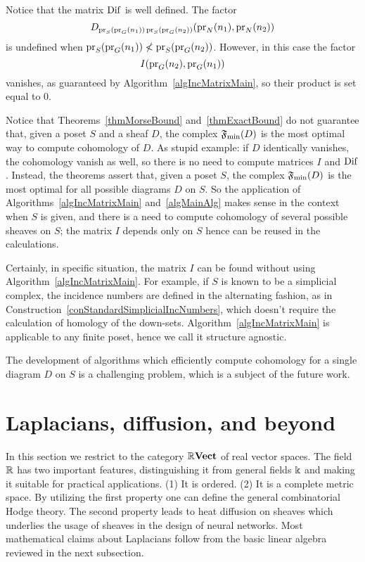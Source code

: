Notice that the matrix $\operatorname{Dif}$ is well defined. The factor
\[
D_{\operatorname{pr}_S(\operatorname{pr}_G(n_1))\operatorname{pr}_S(\operatorname{pr}_G(n_2))}(\operatorname{pr}_N(n_1),\operatorname{pr}_N(n_2))
\]
is undefined when $\operatorname{pr}_S(\operatorname{pr}_G(n_1))\nless\operatorname{pr}_S(\operatorname{pr}_G(n_2))$. However, in this case the factor
\[
I(\operatorname{pr}_G(n_2),\operatorname{pr}_G(n_1))
\]
vanishes, as guaranteed by Algorithm~\ref{algIncMatrixMain}, so their product is set equal to $0$.

\begin{rem}\label{remAgnosticComputations}
Notice that Theorems~\ref{thmMorseBound} and~\ref{thmExactBound} do not guarantee that, given a poset $S$ and a sheaf $D$, the complex $\mathfrak{F}_{\min}(D)$ is the most optimal way to compute cohomology of $D$. As stupid example: if $D$ identically vanishes, the cohomology vanish as well, so there is no need to compute matrices $I$ and $\operatorname{Dif}$. Instead, the theorems assert that, given a poset $S$, the complex $\mathfrak{F}_{\min}(D)$ is the most optimal for all possible diagrams $D$ on $S$. So the application of Algorithms~\ref{algIncMatrixMain} and~\ref{algMainAlg} makes sense in the context when $S$ is given, and there is a need to compute cohomology of several possible sheaves on $S$; the matrix $I$ depends only on $S$ hence can be reused in the calculations.

Certainly, in specific situation, the matrix $I$ can be found without using Algorithm~\ref{algIncMatrixMain}. For example, if $S$ is known to be a simplicial complex, the incidence numbers are defined in the alternating fashion, as in Construction~\ref{conStandardSimplicialIncNumbers}, which doesn't require the calculation of homology of the down-sets. Algorithm~\ref{algIncMatrixMain} is applicable to any finite poset, hence we call it structure agnostic.

The development of algorithms which efficiently compute cohomology for a single diagram $D$ on $S$ is a challenging problem, which is a subject of the future work.
\end{rem}

\section{Laplacians, diffusion, and beyond}\label{secMathLaplacians}

In this section we restrict to the category $\mathbb{R}\mathbf{Vect}$ of real vector spaces. The field $\mathbb{R}$ has two important features, distinguishing it from general fields $\Bbbk$ and making it suitable for practical applications. (1) It is ordered. (2) It is a complete metric space. By utilizing the first property one can define the general combinatorial Hodge theory. The second property leads to heat diffusion on sheaves which underlies the usage of sheaves in the design of neural networks. Most mathematical claims about Laplacians follow from the basic linear algebra reviewed in the next subsection. 

